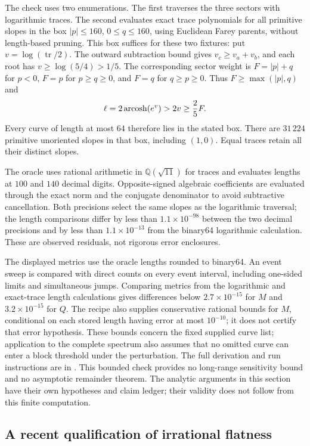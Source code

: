 The check uses two enumerations. The first traverses the three sectors
with logarithmic traces. The second evaluates exact trace polynomials
for all primitive slopes in the box $|p|\le160$, $0\le q\le160$,
using Euclidean Farey parents, without length-based pruning. This box
suffices for these two fixtures: put $v=\log(\operatorname{tr}/2)$.
The outward subtraction bound gives $v_c\ge v_a+v_b$, and each root
has $v\ge\log(5/4)>1/5$. The corresponding sector weight is
$F=|p|+q$ for $p<0$, $F=p$ for $p\ge q\ge0$, and $F=q$ for
$q\ge p\ge0$. Thus $F\ge\max(|p|,q)$ and
\[
 \ell=2\operatorname{arcosh}(e^v)>2v\ge\frac25F.
\]
Every curve of length at most $64$ therefore lies in the stated box.
There are $31\,224$ primitive unoriented slopes in that box, including
$(1,0)$. Equal traces retain all their distinct slopes.

The oracle uses rational arithmetic in $\mathbb Q(\sqrt{11})$ for
traces and evaluates lengths at $100$ and $140$ decimal digits.
Opposite-signed algebraic coefficients are evaluated through the exact
norm and the conjugate denominator to avoid subtractive cancellation.
Both precisions select the same slopes as the logarithmic traversal;
the length comparisons differ by less than $1.1\times10^{-98}$ between
the two decimal precisions and by less than $1.1\times10^{-13}$ from
the binary64 logarithmic calculation. These are observed residuals,
not rigorous error enclosures.

The displayed metrics use the oracle lengths rounded to binary64.
An event sweep is compared with direct counts on every event interval,
including one-sided limits and simultaneous jumps. Comparing metrics
from the logarithmic and exact-trace length calculations gives differences
below $2.7\times10^{-15}$ for $M$ and $3.2\times10^{-15}$ for $Q$.
The recipe also supplies conservative rational bounds for $M$, conditional
on each stored length having error at most $10^{-10}$; it does not
certify that error hypothesis. These bounds concern the fixed supplied
curve list; application to the complete spectrum also assumes that no
omitted curve can enter a block threshold under the perturbation.
The full derivation and run instructions
are in . This bounded check provides
no long-range sensitivity bound and no asymptotic remainder theorem.
The analytic arguments in this section have their own hypotheses and
claim ledger; their validity does not follow from this finite computation.

\subsection{A recent qualification of irrational flatness}
\label{subsec:recentflatnessqualification}

